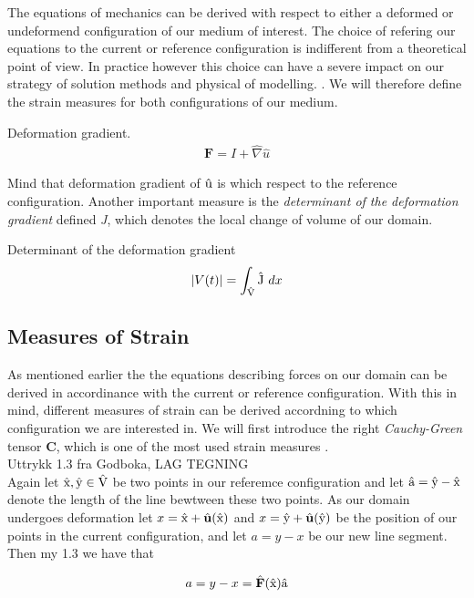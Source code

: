 The equations of mechanics can be derived with respect to either a deformed or undeformend configuration of our medium of interest. The choice of refering our equations to the current or reference configuration is indifferent from a theoretical point of view. In practice however this choice can have a severe impact on our strategy of solution methods and physical of modelling.   \cite{Wriggers2006}. We will therefore define the strain measures for both configurations of our medium.  

\begin{defn}
Deformation gradient. 
\begin{align}
\textbf{F} = I + \hat{\nabla} \hat{u} 
\end{align} 
\end{defn}

Mind that deformation gradient of $\text{\^{u}}$ is which respect to the reference configuration. 
Another important measure is the \textit{determinant of the deformation gradient} defined \textit{J}, which denotes the local change of volume of our domain.

\begin{defn}
Determinant of the deformation gradient
\begin{align}
|V(t)| = \int_{\text{\^{V}}} \text{\text{\^{J}} } dx
\end{align} 
\end{defn}

\subsection{Measures of Strain}
As mentioned earlier the the equations describing forces on our domain can be derived in accordinance with the current or
reference configuration. With this in mind, different measures of strain can be derived accordning to which configuration we are 
interested in. We will first introduce the right \textit{Cauchy-Green} tensor \textbf{C}, which is one of the most used strain measures \cite{Wriggers2006}. \\ Uttrykk 1.3 fra Godboka, LAG TEGNING \\ 

Again let $\text{\^{x}}, \text{\^{y}} \in \text{\^{V}}$ be two points in our referemce configuration and let $\text{\^{a}} = \text{\^{y}} - \text{\^{x}}$ denote the
length of the line bewtween these two points. As our domain undergoes deformation let 
$x = \ha{x} + \hat{u}( \ha{x} )  $ and $x = \ha{y} + \hat{u}( \ha{y} )  $ be the position of our points in the current configuration, and let $a = y - x$ be our new line segment. Then my 1.3 we have that 

\begin{align*}
a = y  - x = \hat{F}(\ha{x})\ha{a}
\end{align*}



